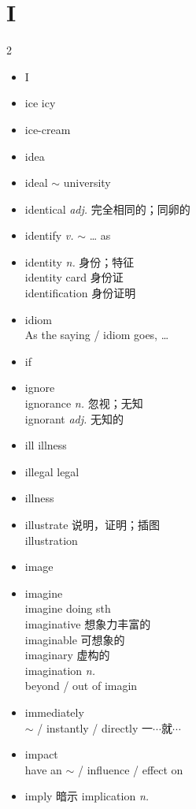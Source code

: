 \documentclass[../../book.tex]{subfiles}
\begin{document}
\section{I}
\raggedcolumns
\begin{multicols}{2}
\begin{itemize}
\item[-] I
\item[-] ice \phantom{a} icy
\item[-] ice-cream
\item[-] idea
\item[-] ideal \phantom{a} $\sim$ university
\item[-] identical \emph{adj.} 完全相同的；同卵的
\item[-] identify \emph{v.} $\sim$ \ldots{} as
\item[-] identity \emph{n.} 身份；特征
\\identity card 身份证
\\identification 身份证明
\item[-] idiom
\\As the saying / idiom goes, \ldots
\item[-] if
\item[-] ignore
\\ignorance \emph{n.} 忽视；无知
\\ignorant \emph{adj.} 无知的
\item[-] ill \phantom{a} illness
\item[-] illegal \phantom{a} legal
\item[-] illness
\item[-] illustrate 说明，证明；插图
\\illustration
\item[-] image
\item[-] imagine
\\imagine doing sth
\\imaginative 想象力丰富的
\\imaginable 可想象的
\\imaginary 虚构的
\\imagination \emph{n.}
\\beyond / out of imagin
\item[-] immediately
\\$\sim$ / instantly / directly 一$\cdots$就$\cdots$
\item[-] impact
\\have an $\sim$ / influence / effect on
\item[-] imply 暗示 \phantom{a} implication \emph{n.}

\end{itemize}
\end{multicols}
\end{document}
